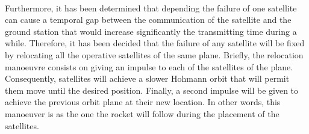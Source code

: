 \paragraph{}Furthermore, it has been determined that depending the failure of one satellite can cause a temporal gap between the communication of the satellite and the ground station that would increase significantly the transmitting time during a while. Therefore, it has been decided that the failure of any satellite will be fixed by relocating all the operative satellites of the same plane. Briefly, the relocation manoeuvre consists on giving an impulse to each of the satellites of the plane. Consequently, satellites will achieve a slower Hohmann orbit that will permit them move until the desired position. Finally, a second impulse will be given to achieve the previous orbit plane at their new location. In other words, this manoeuver is as the one the rocket will follow during the placement of the satellites. 
